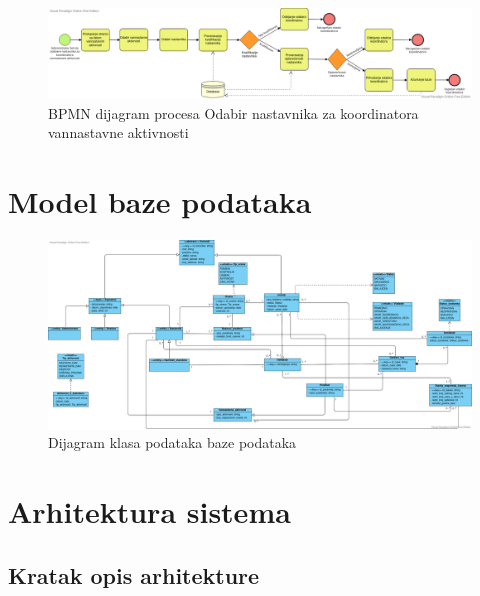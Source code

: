 \documentclass{article}
\begin{document}
\begin{landscape}
\begin{figure} [!ht]
    \begin{center}
        \includegraphics[scale=0.4]{imgs/BPMN_odabir_koordinatora.png}
    \end{center}
\caption{BPMN dijagram procesa Odabir nastavnika za koordinatora vannastavne aktivnosti}
\end{figure}
\end{landscape}

\section{Model baze podataka}

\begin{figure} [!ht]
    \begin{center}
        \includegraphics[angle=90,scale=0.22]{imgs/dijagram_klasa_podataka.png}
    \end{center}
\caption{Dijagram klasa podataka baze podataka}
\end{figure}


\section{Arhitektura sistema}

\subsection{Kratak opis arhitekture}
\end{document}
